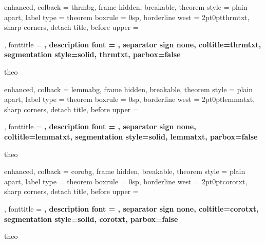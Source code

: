 
\usepackage[utf8]{inputenc}
\usepackage{amssymb}
\usepackage{amsmath}
\usepackage{amsthm}
\usepackage{blindtext}
\usepackage[utf8]{inputenc}
\usepackage{mathtools}

\setcounter{chapter}{-1}
\usepackage{xcolor}
\usepackage{hyperref}
\hypersetup{colorlinks=true,linkcolor=blue}
\pagecolor{white}
\usepackage[many]{tcolorbox}
\usepackage{minitoc}
\setlength{\parskip}{0.8em}
\setlength{\parindent}{0em}




{%
	enhanced,
	colback = thrmbg,
	frame hidden,
    breakable,
    theorem style = plain apart,
    label type = theorem
	boxrule = 0sp,
	borderline west = {2pt}{0pt}{thrmtxt},
	sharp corners,
	detach title,
	before upper = \tcbtitle\par\smallskip,
	fonttitle = \bfseries\sffamily\large,
	description font = \mdseries,
	separator sign none,
    coltitle=thrmtxt,
	segmentation style={solid, thrmtxt},
    parbox=false
}
{theo}

{%
	enhanced,
	colback = lemmabg,
	frame hidden,
    breakable,
    theorem style = plain apart,
    label type = theorem
	boxrule = 0sp,
	borderline west = {2pt}{0pt}{lemmatxt},
	sharp corners,
	detach title,
	before upper = \tcbtitle\par\smallskip,
	fonttitle = \bfseries\sffamily\large,
	description font = \mdseries,
	separator sign none,
    coltitle=lemmatxt,
	segmentation style={solid, lemmatxt},
    parbox=false
}
{theo}

{%
	enhanced,
	colback = corobg,
	frame hidden,
    breakable,
    theorem style = plain apart,
    label type = theorem
	boxrule = 0sp,
	borderline west = {2pt}{0pt}{corotxt},
	sharp corners,
	detach title,
	before upper = \tcbtitle\par\smallskip,
	fonttitle = \bfseries\sffamily\large,
	description font = \mdseries,
	separator sign none,
    coltitle=corotxt,
	segmentation style={solid, corotxt},
    parbox=false
}
{theo}

